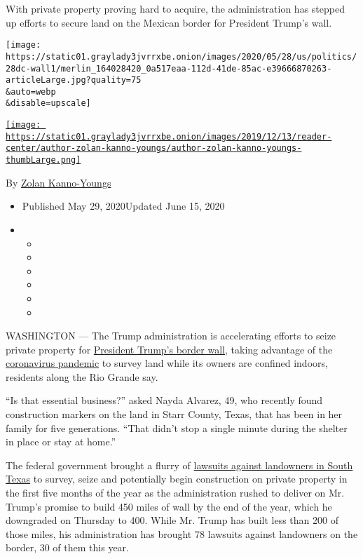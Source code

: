 With private property proving hard to acquire, the administration has
stepped up efforts to secure land on the Mexican border for President
Trump's wall.

\texttt{[image: https://static01.graylady3jvrrxbe.onion/images/2020/05/28/us/politics/28dc-wall1/merlin\_164028420\_0a517eaa-112d-41de-85ac-e39666870263-articleLarge.jpg?quality=75\\\&auto=webp\\\&disable=upscale]}

\href{https://www.nytimes3xbfgragh.onion/by/zolan-kanno-youngs}{\texttt{[image: https://static01.graylady3jvrrxbe.onion/images/2019/12/13/reader-center/author-zolan-kanno-youngs/author-zolan-kanno-youngs-thumbLarge.png]}}

By \href{https://www.nytimes3xbfgragh.onion/by/zolan-kanno-youngs}{Zolan
Kanno-Youngs}

\begin{itemize}
\item
  Published May 29, 2020Updated June 15, 2020
\item
  \begin{itemize}
  \item
  \item
  \item
  \item
  \item
  \item
  \end{itemize}
\end{itemize}

WASHINGTON --- The Trump administration is accelerating efforts to seize
private property for
\href{https://www.nytimes3xbfgragh.onion/2020/03/31/us/coronavirus-border-wall-arizona.html}{President
Trump's border wall}, taking advantage of the
\href{https://www.nytimes3xbfgragh.onion/news-event/coronavirus}{coronavirus
pandemic} to survey land while its owners are confined indoors,
residents along the Rio Grande say.

``Is that essential business?'' asked Nayda Alvarez, 49, who recently
found construction markers on the land in Starr County, Texas, that has
been in her family for five generations. ``That didn't stop a single
minute during the shelter in place or stay at home.''

The federal government brought a flurry of
\href{https://www.nytimes3xbfgragh.onion/2019/12/26/us/politics/trump-border-wall.html}{lawsuits
against landowners in South Texas} to survey, seize and potentially
begin construction on private property in the first five months of the
year as the administration rushed to deliver on Mr. Trump's promise to
build 450 miles of wall by the end of the year, which he downgraded on
Thursday to 400. While Mr. Trump has built less than 200 of those miles,
his administration has brought 78 lawsuits against landowners on the
border, 30 of them this year.

